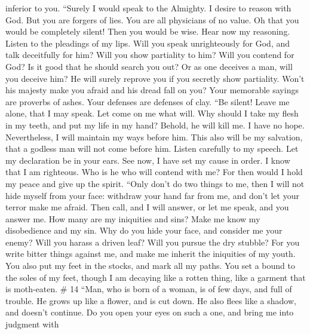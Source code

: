 inferior to you.  ``Surely I would speak to the Almighty.
I desire to reason with God.  But you are forgers of lies.
You are all physicians of no value.  Oh that you would be
completely silent! Then you would be wise.  Hear now my
reasoning. Listen to the pleadings of my lips.  Will you
speak unrighteously for God, and talk deceitfully for him?
 Will you show partiality to him? Will you contend for
God?  Is it good that he should search you out? Or as one
deceives a man, will you deceive him?  He will surely
reprove you if you secretly show partiality.  Won't his
majesty make you afraid and his dread fall on you?  Your
memorable sayings are proverbs of ashes. Your defenses are defenses of
clay.  ``Be silent! Leave me alone, that I may speak. Let
come on me what will.  Why should I take my flesh in my
teeth, and put my life in my hand?  Behold, he will kill
me. I have no hope. Nevertheless, I will maintain my ways before him.
 This also will be my salvation, that a godless man will
not come before him.  Listen carefully to my speech. Let
my declaration be in your ears.  See now, I have set my
cause in order. I know that I am righteous.  Who is he
who will contend with me? For then would I hold my peace and give up the
spirit.  ``Only don't do two things to me, then I will
not hide myself from your face:  withdraw your hand far
from me, and don't let your terror make me afraid.  Then
call, and I will answer, or let me speak, and you answer me.
 How many are my iniquities and sins? Make me know my
disobedience and my sin.  Why do you hide your face, and
consider me your enemy?  Will you harass a driven leaf?
Will you pursue the dry stubble?  For you write bitter
things against me, and make me inherit the iniquities of my youth.
 You also put my feet in the stocks, and mark all my
paths. You set a bound to the soles of my feet,  though I
am decaying like a rotten thing, like a garment that is moth-eaten. \#
14  ``Man, who is born of a woman, is of few days, and
full of trouble.  He grows up like a flower, and is cut
down. He also flees like a shadow, and doesn't continue. 
Do you open your eyes on such a one, and bring me into judgment with
